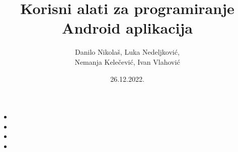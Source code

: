\documentclass{beamer}
\title{Korisni alati za programiranje Android aplikacija}
\author{Danilo Nikolaš, Luka Nedeljković,\\ Nemanja Kelečević, Ivan Vlahović}
\institute[]{Matematički fakultet, Univerzitet u Beogradu}
\date{26.12.2022.}
\begin{document}
\begin{frame}
	\titlepage
\end{frame}

\begin{frame}
    \frametitle{} 
    \begin{itemize}
			\item
			\item 
			\item 
			\item  
   \end{itemize}
\end{frame}
\end{document}
